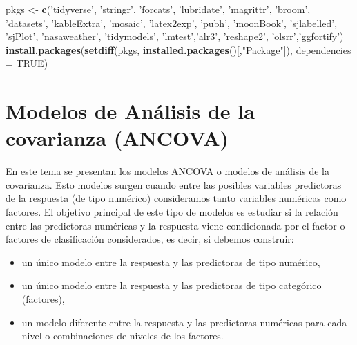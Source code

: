 \documentclass[
]{book}
\newenvironment{Shaded}{\begin{snugshade}}{\end{snugshade}}
\newcommand{\DataTypeTok}[1]{\textcolor[rgb]{0.13,0.29,0.53}{#1}}
\newcommand{\KeywordTok}[1]{\textcolor[rgb]{0.13,0.29,0.53}{\textbf{#1}}}
\newcommand{\NormalTok}[1]{#1}
\newcommand{\OtherTok}[1]{\textcolor[rgb]{0.56,0.35,0.01}{#1}}
\newcommand{\StringTok}[1]{\textcolor[rgb]{0.31,0.60,0.02}{#1}}
\providecommand{\tightlist}{%
  \setlength{\itemsep}{0pt}\setlength{\parskip}{0pt}}
\theoremstyle{definition}
\theoremstyle{definition}
\theoremstyle{definition}
\theoremstyle{remark}
\begin{document}
\begin{Shaded}
\begin{Highlighting}[]
\NormalTok{pkgs <-}\StringTok{ }\KeywordTok{c}\NormalTok{(}\StringTok{'tidyverse'}\NormalTok{, }\StringTok{'stringr'}\NormalTok{, }\StringTok{'forcats'}\NormalTok{, }\StringTok{'lubridate'}\NormalTok{, }
          \StringTok{'magrittr'}\NormalTok{, }\StringTok{'broom'}\NormalTok{, }\StringTok{'datasets'}\NormalTok{, }\StringTok{'kableExtra'}\NormalTok{, }
          \StringTok{'mosaic'}\NormalTok{, }\StringTok{'latex2exp'}\NormalTok{, }\StringTok{'pubh'}\NormalTok{, }\StringTok{'moonBook'}\NormalTok{,}
          \StringTok{'sjlabelled'}\NormalTok{, }\StringTok{'sjPlot'}\NormalTok{, }\StringTok{'nasaweather'}\NormalTok{, }\StringTok{'tidymodels'}\NormalTok{, }
          \StringTok{'lmtest'}\NormalTok{,}\StringTok{'alr3'}\NormalTok{, }\StringTok{'reshape2'}\NormalTok{, }\StringTok{'olsrr'}\NormalTok{,}\StringTok{'ggfortify'}\NormalTok{)}
\KeywordTok{install.packages}\NormalTok{(}\KeywordTok{setdiff}\NormalTok{(pkgs, }\KeywordTok{installed.packages}\NormalTok{()[,}\StringTok{"Package"}\NormalTok{]), }
                 \DataTypeTok{dependencies =} \OtherTok{TRUE}\NormalTok{)}
\end{Highlighting}
\end{Shaded}

\hypertarget{modelos-de-anuxe1lisis-de-la-covarianza-ancova}{%
\chapter{Modelos de Análisis de la covarianza (ANCOVA)}\label{modelos-de-anuxe1lisis-de-la-covarianza-ancova}}

En este tema se presentan los modelos ANCOVA o modelos de análisis de la covarianza. Esto modelos surgen cuando entre las posibles variables predictoras de la respuesta (de tipo numérico) consideramos tanto variables numéricas como factores. El objetivo principal de este tipo de modelos es estudiar si la relación entre las predictoras numéricas y la respuesta viene condicionada por el factor o factores de clasificación considerados, es decir, si debemos construir:

\begin{itemize}
\tightlist
\item
  un único modelo entre la respuesta y las predictoras de tipo numérico,
\item
  un único modelo entre la respuesta y las predictoras de tipo categórico (factores),
\item
  un modelo diferente entre la respuesta y las predictoras numéricas para cada nivel o combinaciones de niveles de los factores.
\end{itemize}
\end{document}
